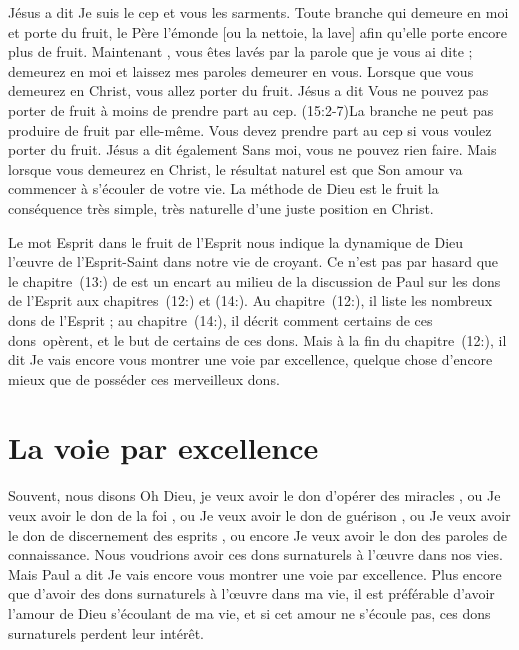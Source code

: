 Jésus a dit\frcolon{} \Og Je suis le cep et vous les sarments.
 Toute branche qui demeure en moi et porte du fruit,
 le Père l'émonde [ou la nettoie, la lave] afin qu'elle porte
 encore plus de fruit. Maintenant , vous êtes lavés par la parole
 que je vous ai dite ; demeurez en moi et laissez mes paroles
 demeurer en vous. \Fg{}
 Lorsque que vous demeurez en Christ, vous allez porter du fruit.
 Jésus a dit\frcolon{} \Og Vous ne pouvez pas porter de fruit à moins
 de prendre part au cep. \Fg{} (15:2-7)La branche
 ne peut pas produire de fruit par elle-même.
 Vous devez prendre part au cep si vous voulez porter du fruit.
 Jésus a dit également\frcolon{} \Og Sans moi, vous ne pouvez rien faire. \Fg{}
 Mais lorsque vous demeurez en Christ, le résultat naturel
 est que Son amour va commencer à s'écouler de votre vie.
 La méthode de Dieu est le fruit \ocadr la conséquence très simple,
 très naturelle d'une juste position en Christ.

Le mot \Og Esprit \Fg{} dans \Og le fruit de l'Esprit \Fg{}
 nous indique la dynamique de Dieu \ocadr l'œuvre de l'Esprit-Saint
 dans notre vie de croyant. Ce n'est pas par hasard que le
 chapitre~(13:) de  est un encart
 au milieu de la discussion de Paul sur les dons de l'Esprit
 aux chapitres~(12:) et (14:).
 Au chapitre~(12:), il liste les nombreux dons de l'Esprit ;
 au chapitre~(14:), il décrit comment certains
 de ces dons~opèrent, et le but de certains de ces dons.
 Mais à la fin du chapitre~(12:), il dit\frcolon{}
 \Og Je vais encore vous montrer une voie par excellence, \Fg{}
 quelque chose d'encore mieux que de posséder ces merveilleux dons.


\section{La voie par excellence}

Souvent, nous disons\frcolon{}
 \Og Oh Dieu, je veux avoir le don d'opérer des miracles \Fg{}, ou\frcolon{}
 \Og Je veux avoir le don de la foi \Fg{}, ou\frcolon{}
 \Og Je veux avoir le don de guérison \Fg{}, ou\frcolon{}
 \Og Je veux avoir le don de discernement des esprits \Fg{}, ou encore\frcolon{}
 \Og Je veux avoir le don des paroles de connaissance. \Fg{}
 Nous voudrions avoir ces dons surnaturels à l'œuvre dans nos vies.
 Mais Paul a dit\frcolon{}
 \Og Je vais encore vous montrer une voie par excellence. \Fg{}
 Plus encore que d'avoir des dons surnaturels à l'œuvre dans ma vie,
 il est préférable d'avoir l'amour de Dieu s'écoulant de ma vie,
 et si cet amour ne s'écoule pas, ces dons surnaturels perdent leur intérêt.


